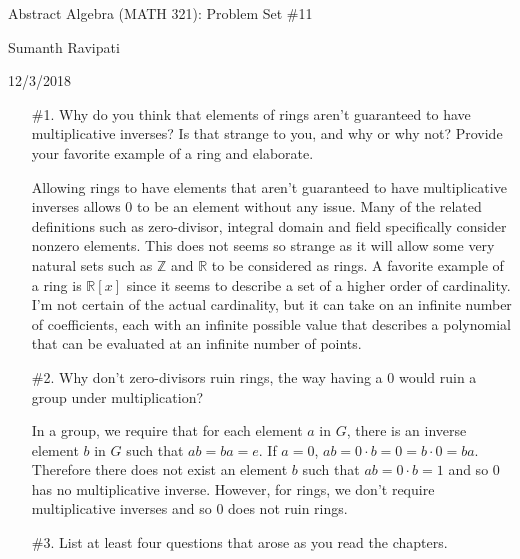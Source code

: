 \documentclass{article}
\newcommand{\Z}{\mathbb Z}
\newcommand{\R}{\mathbb R}
\begin{document}
%
\centerline{\Large Abstract Algebra (MATH 321): Problem Set \#11}
\centerline{Sumanth Ravipati}
\centerline{12/3/2018}

\begin{enumerate}
    \item[\#1.] Why do you think that elements of rings aren't guaranteed to have multiplicative inverses? Is that strange to you, and why or why not? Provide your favorite example of a ring and elaborate.
    
    \begin{flushleft}
    Allowing rings to have elements that aren't guaranteed to have multiplicative inverses allows 0 to be an element without any issue. Many of the related definitions such as zero-divisor, integral domain and field specifically consider nonzero elements. This does not seems so strange as it will allow some very natural sets such as $\Z$ and $\R$ to be considered as rings. A favorite example of a ring is $\R[x]$ since it seems to describe a set of a higher order of cardinality. I'm not certain of the actual cardinality, but it can take on an infinite number of coefficients, each with an infinite possible value that describes a polynomial that can be evaluated at an infinite number of points.
    \end{flushleft}
    
    \item[\#2.] Why don’t zero-divisors ruin rings, the way having a 0 would ruin a group under multiplication?
    
    \begin{flushleft}
    In a group, we require that for each element $a$ in $G$, there is an inverse element $b$ in $G$ such that $ab = ba = e$. If $a = 0$, $ab = 0\cdot b = 0 = b \cdot 0 = ba$. Therefore there does not exist an element $b$ such that $ab = 0\cdot b= 1$ and so 0 has no multiplicative inverse. However, for rings, we don't require multiplicative inverses and so 0 does not ruin rings.
    \end{flushleft}
    
    \item[\#3.] List at least four questions that arose as you read the chapters.
    

\end{enumerate}
\end{document}

